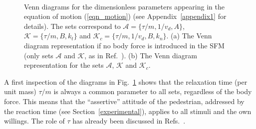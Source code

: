 \documentclass[preprint,12pt]{elsarticle}
\begin{document}
\begin{figure}[!htbp]
\centering
 
 \hfill
{}\\
\caption[width=0.47\columnwidth]{Venn diagrams for the dimensionless parameters
appearing in the equation of motion (\ref{eqn_motion}) (see
Appendix~\ref{appendix1} for details). The sets correspond to
$\mathcal{A}=\{\tau/m,1/v_d,A\}$, $\mathcal{K}=\{\tau/m,B,k_t\}$ and
$\mathcal{K}_c=\{\tau/m,1/v_d,B,k_n\}$. (a) The Venn diagram representation if
no  body force is introduced in the SFM (only sets $\mathcal{A}$ and
$\mathcal{K}$,  as in Ref.~\cite{dorso_2019}). (b) The Venn diagram
representation for the sets  $\mathcal{A}$, $\mathcal{K}$ and $\mathcal{K}_c$.}
\label{venn_diagram} 
\end{figure}

A first inspection of the diagrams in Fig.~\ref{venn_diagram} shows that the
relaxation time (per unit mass) $\tau/m$ is always a common parameter to all
sets, regardless of the body force. This means that the ``assertive'' attitude
of the pedestrian, addressed by the reaction time (see
Section~\ref{experimental}), applies to all stimuli and the own willings. The
role of $\tau$ has already been discussed in
Refs.~\cite{johansson_2009,dorso_2019}.    \\
\end{document}
